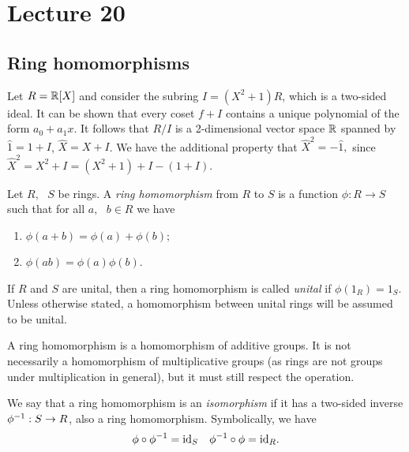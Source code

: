 \section{Lecture 20}
\subsection{Ring homomorphisms}
\begin{example}
  Let $R = \mathbb R[X]$ and consider the subring $I=(X^2+1)R$, which is a two-sided ideal. It can be shown that every coset $f+I$ contains a unique polynomial of the form $a_0+a_1x$. It
  follows that $R/I$ is a 2-dimensional vector space $\mathbb R$ spanned by $\hat{1}=1+I$,
  $\hat{X}=X+I$. We have the additional property that $\hat{X}^2 = -\hat{1},$ since $\hat{X}^2= X^2 + I = (X^2+1)+I - (1+I)$. 
\end{example}

\begin{definition}
  Let $R,\text{ }S$ be rings. A \emph{ring homomorphism} from $R$ to $S$ is a function $\phi:R\to S$
  such that for all $a,\text{ }b\in R$ we have 
  \begin{enumerate}
    \item $\phi(a+b)=\phi(a)+\phi(b);$ 
    \item $\phi(ab)=\phi(a)\phi(b)$. 
    
  \end{enumerate}

  If $R$ and $S$ are unital, then a ring homomorphism is called \emph{unital} if $\phi(1_R)=1_S$. Unless otherwise stated, a homomorphism between unital rings will be assumed to be unital.

  \end{definition}
  
  \begin{remark}
     A ring homomorphism is a homomorphism of additive groups. It is not necessarily a homomorphism of multiplicative groups (as rings are not groups under multiplication in general), but it must still respect the operation. %
  \end{remark}
  
  
\begin{definition}
  We say that a ring homomorphism is an \emph{isomorphism} if it has a two-sided inverse
  $\phi^{-1}:S\to R$, also a ring homomorphism. Symbolically, we have 
  \[\phi \circ \phi^{-1} = \mathrm{id}_S \quad \phi^{-1}\circ\phi = \mathrm{id}_R.\]
  \label{def:ringHomUnital}
\end{definition}

